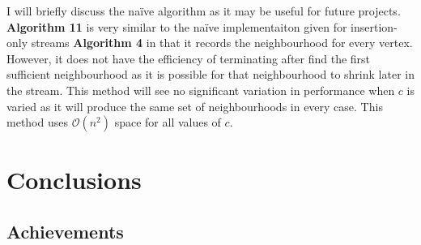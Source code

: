 \documentclass[11pt,twoside,a4paper]{report}
\begin{document}
\par I will briefly discuss the na\"ive algorithm as it may be useful for future projects. \textbf{Algorithm 11} is very similar to the na\"ive implementaiton given for insertion-only streams \textbf{Algorithm 4} in that it records the neighbourhood for every vertex. However, it does not have the efficiency of terminating after find the first sufficient neighbourhood as it is possible for that neighbourhood to shrink later in the stream. This method will see no significant variation in performance when $c$ is varied as it will produce the same set of neighbourhoods in every case. This method uses $\mathcal{O}(n^2)$ space for all values of $c$.

\chapter{Conclusions}

\section{Achievements}
\end{document}
